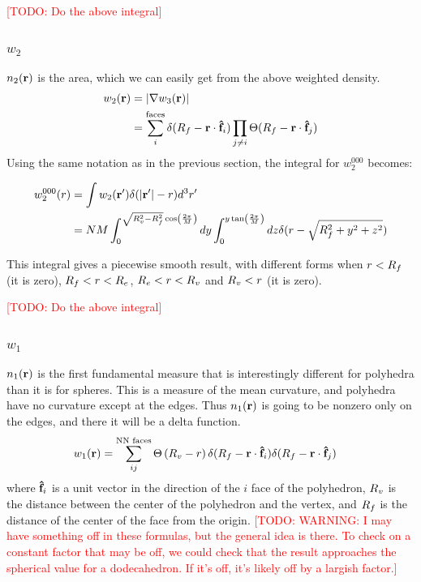 \documentclass[letterpaper,twocolumn,amsmath,amssymb,pre]{revtex4-1}
\newcommand{\todo}[1]{\textcolor{red}{[TODO: #1]}}
\begin{document}
\todo{Do the above integral}

\subsubsection{$w_2$}
$n_2(\mathbf{r})$ is the area, which we can easily get from the above
weighted density.
\begin{align}
  w_2(\mathbf{r}) &= |\nabla w_3(\mathbf{r})| \\
  &= \sum_i^{\text{faces}} \delta(R_f-\mathbf{r}\cdot\mathbf{\hat{f}}_i)
  \prod_{j\ne i} \Theta(R_f-\mathbf{r}\cdot\mathbf{\hat{f}}_j)
\end{align}
Using the same notation as in the previous section, the integral
for $w_2^{000}$ becomes:
\begin{widetext}
\begin{align}
  w_2^{000}(r) &= \int w_2(\mathbf{r}') \delta(|\mathbf{r}'|-r) d^3r'
  \\
  &= NM
  \int_0^{\sqrt{R_v^2-R_f^2}\cos\left(\frac{2\pi}{M}\right)} dy
  \int_0^{y\tan\left(\frac{2\pi}{M}\right)} dz \delta(r - \sqrt{R_f^2 +
    y^2 + z^2})
\end{align}
\end{widetext}
This integral gives a piecewise smooth result, with different forms
when $r<R_f$ (it is zero), $R_f<r<R_e$, $R_e<r<R_v$ and $R_v<r$ (it is
zero).

\todo{Do the above integral}

\subsubsection{$w_1$}

$n_1(\mathbf{r})$ is the first fundamental measure that is interestingly
different for polyhedra than it is for spheres.  This is a measure of
the mean curvature, and polyhedra have no curvature except at the
edges.  Thus $n_1(\mathbf{r})$ is going to be nonzero only on the edges, and
there it will be a delta function.
\begin{align}\label{eq:w1}
  w_1(\mathbf{r}) &= \sum_{ij}^{\text{NN faces}}
  \Theta\left(R_v - r\right)
  \delta(R_f - \mathbf{r}\cdot \mathbf{\hat{f}}_i)
  \delta(R_f - \mathbf{r}\cdot \mathbf{\hat{f}}_j)
\end{align}
where $\mathbf{\hat{f}}_i$ is a unit vector in the direction of the $i$ face
of the polyhedron, $R_v$ is the distance between the center of
the polyhedron and the vertex, and $R_f$ is the distance of the
center of the face from the origin.  \todo{WARNING: I may have something off
in these formulas, but the general idea is there.  To check on a
constant factor that may be off, we could check that the result
approaches the spherical value for a dodecahedron.  If it's off, it's
likely off by a largish factor.}
\end{document}

